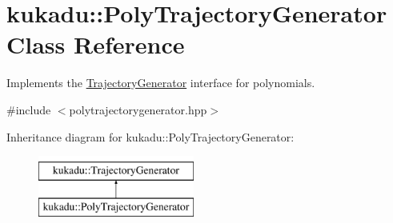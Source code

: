 \hypertarget{classkukadu_1_1PolyTrajectoryGenerator}{\section{kukadu\-:\-:Poly\-Trajectory\-Generator Class Reference}
\label{classkukadu_1_1PolyTrajectoryGenerator}
}


Implements the \hyperlink{classkukadu_1_1TrajectoryGenerator}{Trajectory\-Generator} interface for polynomials.  




{\ttfamily \#include $<$polytrajectorygenerator.\-hpp$>$}

Inheritance diagram for kukadu\-:\-:Poly\-Trajectory\-Generator\-:\begin{figure}[H]
\begin{center}
\leavevmode
\includegraphics[height=2.000000cm]{classkukadu_1_1PolyTrajectoryGenerator}
\end{center}
\end{figure}

